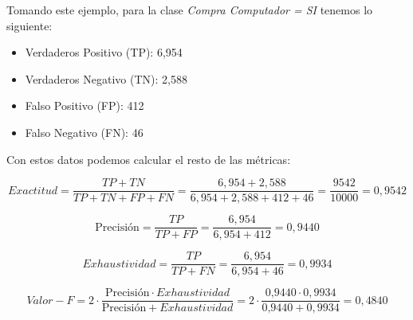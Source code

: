 Tomando este ejemplo, para la clase \textit{Compra Computador = SI} tenemos lo siguiente:

\begin{itemize}
	\item Verdaderos Positivo (TP): 6,954
	\item Verdaderos Negativo (TN): 2,588
	\item Falso Positivo (FP): 412
	\item Falso Negativo (FN): 46
\end{itemize}

Con estos datos podemos calcular el resto de las métricas:

\begin{equation*}
Exactitud = \frac{TP + TN}{TP + TN + FP + FN} = \frac{6,954 + 2,588}{6,954 + 2,588 + 412 + 46} = \frac{9542}{10000} = 0,9542
\end{equation*}

\begin{equation*}
\mbox{Precisión} = \frac{TP}{TP + FP} = \frac{6,954}{6,954 + 412} = 0,9440
\end{equation*}

\begin{equation*}
Exhaustividad = \frac{TP}{TP + FN} = \frac{6,954}{6,954 + 46} = 0,9934
\end{equation*}

\begin{equation*}
Valor-F = 2 \cdot \frac{\mbox{Precisión} \cdot Exhaustividad}{\mbox{Precisión} + Exhaustividad} 
		= 2 \cdot \frac{\mbox{0,9440} \cdot 0,9934}{\mbox{0,9440} + 0,9934}
		= 0,4840
\end{equation*}

